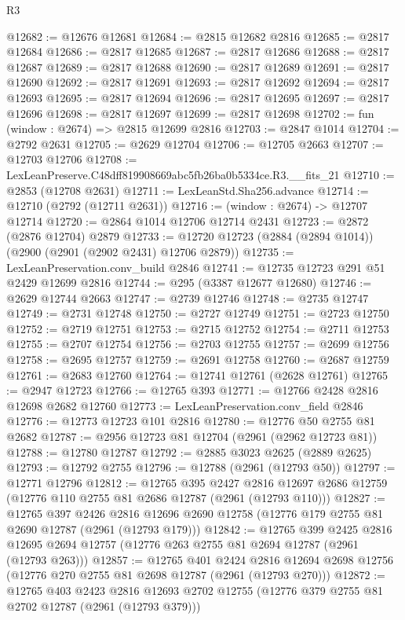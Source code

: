 \begin{lexlean}{R3}
\begin{coremodule}
@12682 := @12676 @12681
@12684 := @2815 @12682 @2816
@12685 := @2817 @12684
@12686 := @2817 @12685
@12687 := @2817 @12686
@12688 := @2817 @12687
@12689 := @2817 @12688
@12690 := @2817 @12689
@12691 := @2817 @12690
@12692 := @2817 @12691
@12693 := @2817 @12692
@12694 := @2817 @12693
@12695 := @2817 @12694
@12696 := @2817 @12695
@12697 := @2817 @12696
@12698 := @2817 @12697
@12699 := @2817 @12698
@12702 := fun (window : @2674) => @2815 @12699 @2816
@12703 := @2847 @1014
@12704 := @2792 @2631
@12705 := @2629 @12704
@12706 := @12705 @2663
@12707 := @12703 @12706
@12708 := LexLeanPreserve.C48dff819908669abc5fb26ba0b5334ce.R3.__fits_21
@12710 := @2853 (@12708 @2631)
@12711 := LexLeanStd.Sha256.advance
@12714 := @12710 (@2792 (@12711 @2631))
@12716 := (window : @2674) -> @12707 @12714
@12720 := @2864 @1014 @12706 @12714 @2431
@12723 := @2872 (@2876 @12704) @2879
@12733 := @12720 @12723 (@2884 (@2894 @1014)) (@2900 (@2901 (@2902 @2431) @12706 @2879))
@12735 := LexLeanPreservation.conv_build @2846
@12741 := @12735 @12723 @291 @51 @2429 @12699 @2816
@12744 := @295 (@3387 @12677 @12680)
@12746 := @2629 @12744 @2663
@12747 := @2739 @12746
@12748 := @2735 @12747
@12749 := @2731 @12748
@12750 := @2727 @12749
@12751 := @2723 @12750
@12752 := @2719 @12751
@12753 := @2715 @12752
@12754 := @2711 @12753
@12755 := @2707 @12754
@12756 := @2703 @12755
@12757 := @2699 @12756
@12758 := @2695 @12757
@12759 := @2691 @12758
@12760 := @2687 @12759
@12761 := @2683 @12760
@12764 := @12741 @12761 (@2628 @12761)
@12765 := @2947 @12723
@12766 := @12765 @393
@12771 := @12766 @2428 @2816 @12698 @2682 @12760
@12773 := LexLeanPreservation.conv_field @2846
@12776 := @12773 @12723 @101 @2816
@12780 := @12776 @50 @2755 @81 @2682
@12787 := @2956 @12723 @81 @12704 (@2961 (@2962 @12723 @81))
@12788 := @12780 @12787
@12792 := @2885 @3023 @2625 (@2889 @2625)
@12793 := @12792 @2755
@12796 := @12788 (@2961 (@12793 @50))
@12797 := @12771 @12796
@12812 := @12765
    @395
    @2427
    @2816
    @12697
    @2686
    @12759
    (@12776 @110 @2755 @81 @2686 @12787 (@2961 (@12793 @110)))
@12827 := @12765
    @397
    @2426
    @2816
    @12696
    @2690
    @12758
    (@12776 @179 @2755 @81 @2690 @12787 (@2961 (@12793 @179)))
@12842 := @12765
    @399
    @2425
    @2816
    @12695
    @2694
    @12757
    (@12776 @263 @2755 @81 @2694 @12787 (@2961 (@12793 @263)))
@12857 := @12765
    @401
    @2424
    @2816
    @12694
    @2698
    @12756
    (@12776 @270 @2755 @81 @2698 @12787 (@2961 (@12793 @270)))
@12872 := @12765
    @403
    @2423
    @2816
    @12693
    @2702
    @12755
    (@12776 @379 @2755 @81 @2702 @12787 (@2961 (@12793 @379)))

\end{coremodule}
\end{lexlean}
